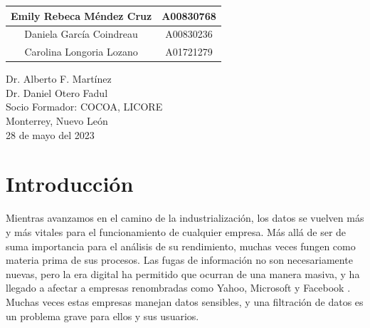 \documentclass{article}
\begin{document}
\begin{titlepage}
\begin{center}
\begin{table}[h!]
\begin{tabular}{ ||c|c|| }
                    \hline
                    Emily Rebeca Méndez Cruz & A00830768 \\
                    \hline
                    Daniela García Coindreau & A00830236 \\
                    \hline
                    Carolina Longoria Lozano & A01721279 \\
                    \hline
                \end{tabular}
            \end{table}
            \vspace{0.7cm}
            \large 	Dr. Alberto F. Martínez \\ %
            \vspace{0.2cm}
            \large 	Dr. Daniel Otero Fadul\\ %
            \vspace{0.2cm}
            \large Socio Formador: COCOA, LICORE \\
            \vspace{0.2cm}
            \large Monterrey, Nuevo León \\
            \vspace{0.2cm}
            \large 28 de mayo del 2023 \\
            \vspace{1cm}
        \end{center}
    \end{titlepage}

    \tableofcontents
    \listoffigures
    \listoftables
    \clearpage
    \renewcommand{\tablename}{Tabla}

    \section{Introducción}

        Mientras avanzamos en el camino de la industrialización, los datos se vuelven más y más vitales para el funcionamiento de cualquier empresa. Más allá de ser de suma importancia para el análisis de su rendimiento, muchas veces fungen como materia prima de sus procesos. Las fugas de información no son necesariamente nuevas, pero la era digital ha permitido que ocurran de una manera masiva, y ha llegado a afectar a empresas renombradas como Yahoo, Microsoft y Facebook \cite{data_breach_biggest}. Muchas veces estas empresas manejan datos sensibles, y una filtración de datos es un problema grave para ellos y sus usuarios.
\end{document}

